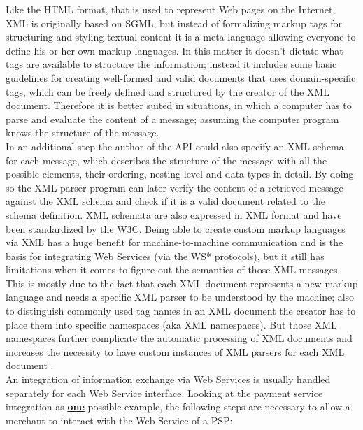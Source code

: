 Like the \gls{HTML} format, that is used to represent Web pages on the Internet, \gls{XML} is originally based on \gls{SGML}, but instead of formalizing markup tags for structuring and styling textual content it is a meta-language allowing everyone to define his or her own markup languages. In this matter it doesn’t dictate what tags are available to structure the information; instead it includes some basic guidelines for creating well-formed and valid documents that uses domain-specific tags, which can be freely defined and structured by the creator of the \gls{XML} document. Therefore it is better suited in situations, in which a computer has to parse and evaluate the content of a message; assuming the computer program knows the structure of the message. \\

In an additional step the author of the \gls{API} could also specify an \gls{XML} schema for each message, which describes the structure of the message with all the possible elements, their ordering, nesting level and data types in detail. By doing so the \gls{XML} parser program can later verify the content of a retrieved message against the \gls{XML} schema and check if it is a valid document related to the schema definition. \gls{XML} schemata are also expressed in \gls{XML} format and have been standardized by the \gls{W3C}. Being able to create custom markup languages via \gls{XML} has a huge benefit for machine-to-machine communication and is the basis for integrating Web Services (via the WS* protocols), but it still has limitations when it comes to figure out the semantics of those \gls{XML} messages. This is mostly due to the fact that each \gls{XML} document represents a new markup language and needs a specific \gls{XML} parser to be understood by the machine; also to distinguish commonly used tag names in an \gls{XML} document the creator has to place them into specific namespaces (aka \gls{XML} namespaces). But those \gls{XML} namespaces further complicate the automatic processing of \gls{XML} documents and increases the necessity to have custom instances of \gls{XML} parsers for each \gls{XML} document \citep{taylor2008p2p}. \\

An integration of information exchange via Web Services is usually handled separately for each Web Service interface. Looking at the payment service integration as \textbf{\underline{one}} possible example, the following steps are necessary to allow a merchant to interact with the Web Service of a \gls{PSP}: \@

